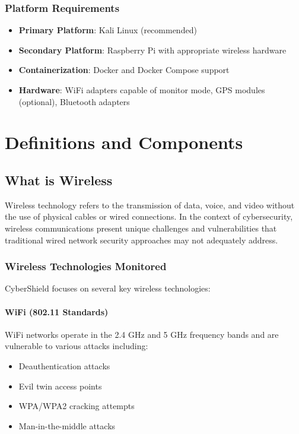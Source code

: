 \documentclass[12pt,a4paper]{report}
\begin{document}
\subsection{Platform Requirements}
\begin{itemize}
    \item \textbf{Primary Platform}: Kali Linux (recommended)
    \item \textbf{Secondary Platform}: Raspberry Pi with appropriate wireless hardware
    \item \textbf{Containerization}: Docker and Docker Compose support
    \item \textbf{Hardware}: WiFi adapters capable of monitor mode, GPS modules (optional), Bluetooth adapters
\end{itemize}

\chapter{Definitions and Components}

\section{What is Wireless}

Wireless technology refers to the transmission of data, voice, and video without the use of physical cables or wired connections. In the context of cybersecurity, wireless communications present unique challenges and vulnerabilities that traditional wired network security approaches may not adequately address.

\subsection{Wireless Technologies Monitored}

CyberShield focuses on several key wireless technologies:

\subsubsection{WiFi (802.11 Standards)}
WiFi networks operate in the 2.4 GHz and 5 GHz frequency bands and are vulnerable to various attacks including:
\begin{itemize}
    \item Deauthentication attacks
    \item Evil twin access points
    \item WPA/WPA2 cracking attempts
    \item Man-in-the-middle attacks
\end{itemize}
\end{document}
